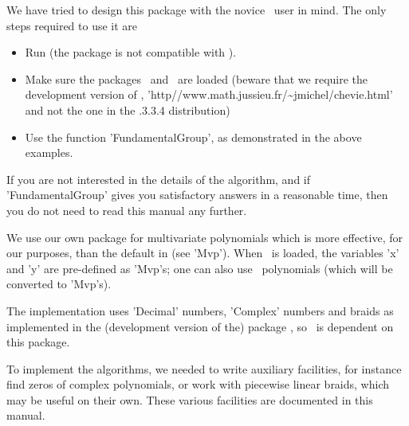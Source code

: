 We have tried to design this package with the novice \GAP\ user in mind.
The only steps required to use it are
\begin{itemize}
\item Run  (the package is not compatible with ).
\item  Make  sure  the  packages   \CHEVIE\  and  \VKCURVE\  are  loaded
(beware   that  we   require   the  development   version  of   \CHEVIE,
'http\://www.math.jussieu.fr/\~{}jmichel/chevie.html' and not the one in
the \GAP.3.3.4 distribution)

\item Use the function 'FundamentalGroup',  as demonstrated in the above
examples.

\end{itemize}
If  you are  not interested  in  the details  of the  algorithm, and  if
'FundamentalGroup' gives you satisfactory  answers in a reasonable time,
then you do not need to read this manual any further.

\bigskip

We  use our  own  package  for multivariate  polynomials  which is  more
effective, for  our purposes, than  the default  in   (see 'Mvp').
When \VKCURVE\ is  loaded, the variables 'x' and 'y'  are pre-defined as
'Mvp's; one can  also use \GAP\ polynomials (which will  be converted to
'Mvp's).

The  implementation uses 'Decimal' numbers, 'Complex' numbers and braids as
implemented  in  the  (development  version  of  the)  package  \CHEVIE, so
\VKCURVE\ is dependent on this package.

To implement  the algorithms, we  needed to write  auxiliary facilities,
for instance find  zeros of complex polynomials, or  work with piecewise
linear  braids,  which  may  be  useful  on  their  own.  These  various
facilities are documented in this manual.


